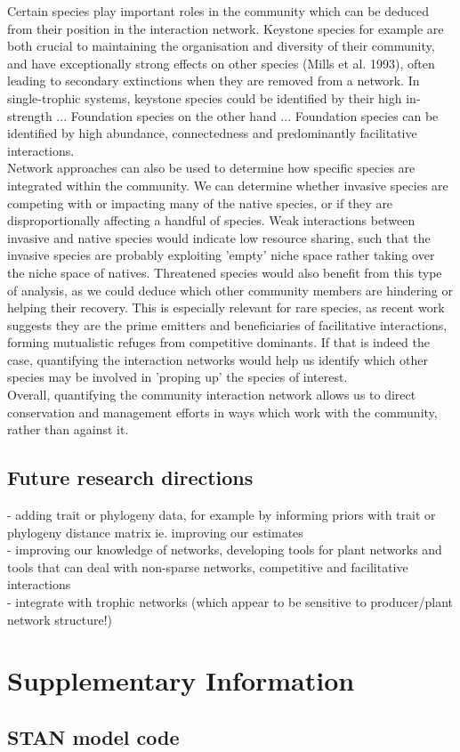 \documentclass[a4,12pt]{article}
\begin{document}
        Certain species play important roles in the community which can be deduced from their position in the interaction network. Keystone species for example are both crucial to maintaining the organisation and diversity of their community, and have exceptionally strong effects on other species (Mills et al. 1993), often leading to secondary extinctions when they are removed from a network. In single-trophic systems, keystone species could be identified by their high in-strength ... Foundation species on the other hand ... Foundation species can be identified by high abundance, connectedness and predominantly facilitative interactions.  \\

        Network approaches can also be used to determine how specific species are integrated within the community. We can determine whether invasive species are competing with or impacting many of the native species, or if they are disproportionally affecting a handful of species. Weak interactions between invasive and native species would indicate low resource sharing, such that the invasive species are probably exploiting 'empty' niche space rather taking over the niche space of natives. Threatened species would also benefit from this type of analysis, as we could deduce which other community members are hindering or helping their recovery. This is especially relevant for rare species, as recent work suggests they are the prime emitters and beneficiaries of facilitative interactions, forming mutualistic refuges from competitive dominants. If that is indeed the case, quantifying the interaction networks would help us identify which other species may be involved in 'proping up' the species of interest. \\

        Overall, quantifying the community interaction network allows us to direct conservation and management efforts in ways which work with the community, rather than against it.


    \subsection{Future research directions}

    
    - adding trait or phylogeny data, for example by informing priors with trait or phylogeny distance matrix
    ie. improving our estimates \\
    - improving our knowledge of networks, developing tools for plant networks and tools that can deal with non-sparse networks, competitive and facilitative interactions \\
    - integrate with trophic networks (which appear to be sensitive to producer/plant network structure!)\\

    

\section{Supplementary Information}

    \subsection{STAN model code}

     
\end{document}
